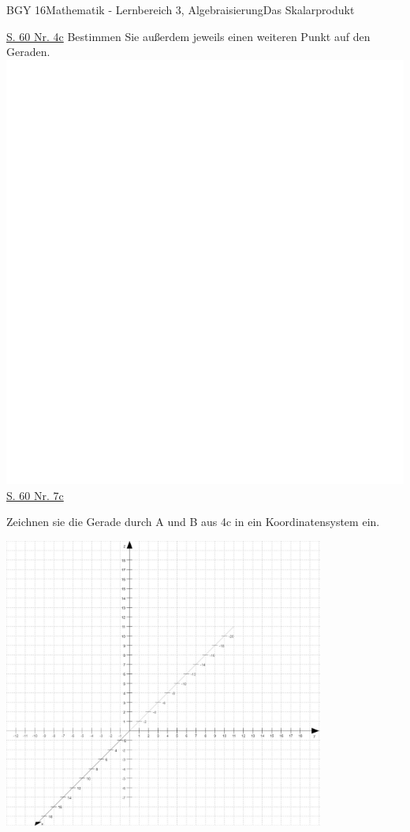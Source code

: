 \documentclass[oneside,openany,headings=optiontotoc,11pt,numbers=noenddot]{scrreprt}
\begin{document}
\begin{worksheet}{BGY 16}{Mathematik - Lernbereich 3, Algebraisierung}{Das Skalarprodukt}
		\begin{framed}
			\noindent
			\underline{S. 60 Nr. 4c} Bestimmen Sie außerdem jeweils einen weiteren Punkt auf den Geraden.\\
			\includegraphics[scale=0.56]{../empty.jpg}\\
			\underline{S. 60  Nr. 7c}
		\end{framed}
		\begin{framed}
			\noindent
			Zeichnen sie die Gerade durch A und B aus 4c in ein Koordinatensystem ein.\\
			\begin{center}
				\includegraphics[width=0.79\textwidth]{Bilder/Koord3D.jpg}\\
			\end{center}
		\end{framed}
	\end{worksheet}
\end{document}
